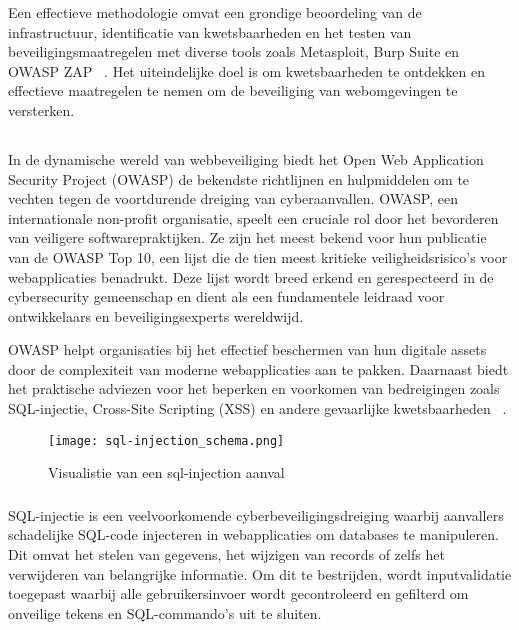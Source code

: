 Een effectieve methodologie omvat een grondige beoordeling van de infrastructuur, identificatie van kwetsbaarheden en het 
testen van beveiligingsmaatregelen met diverse tools zoals Metasploit, Burp Suite en OWASP ZAP ~\autocite{Ravindran2022}. 
Het uiteindelijke doel is om kwetsbaarheden te ontdekken en effectieve maatregelen te nemen om de beveiliging van webomgevingen 
te versterken.

\subsection{}
\label{sec:Aanvallen op veiligheidskwetsbaarheden in Webomgevingen}
In de dynamische wereld van webbeveiliging biedt het Open Web Application Security Project (OWASP) de bekendste richtlijnen en hulpmiddelen om te vechten 
tegen de voortdurende dreiging van cyberaanvallen. OWASP, een internationale non-profit organisatie, speelt een cruciale rol door het bevorderen van 
veiligere softwarepraktijken. Ze zijn het meest bekend voor hun publicatie van de OWASP Top 10, een lijst die de tien meest kritieke veiligheidsrisico's 
voor webapplicaties benadrukt. Deze lijst wordt breed erkend en gerespecteerd in de cybersecurity gemeenschap en dient als een fundamentele leidraad 
voor ontwikkelaars en beveiligingsexperts wereldwijd. 

OWASP helpt organisaties bij het effectief beschermen van hun digitale 
assets door de complexiteit van moderne webapplicaties aan te pakken. Daarnaast biedt het praktische adviezen voor het 
beperken en voorkomen van bedreigingen zoals SQL-injectie, Cross-Site Scripting (XSS) en andere gevaarlijke kwetsbaarheden 
~\autocite{Priyawati2022}.

\begin{figure}
    \centering
    \texttt{[image: sql-injection\_schema.png]}
    \caption[Visualisatie van een sql-injection aanval]{Visualistie van een sql-injection aanval ~\autocite{Biswas2023}}
\end{figure}
\subsubsection{}
\label{sec:SQL-injectie}

SQL-injectie is een veelvoorkomende cyberbeveiligingsdreiging waarbij aanvallers schadelijke SQL-code injecteren in webapplicaties om databases te manipuleren. 
Dit omvat het stelen van gegevens, het wijzigen van records of zelfs het verwijderen van belangrijke informatie. Om dit te bestrijden, wordt inputvalidatie 
toegepast waarbij alle gebruikersinvoer wordt gecontroleerd en gefilterd om onveilige tekens en SQL-commando's uit te sluiten. 

